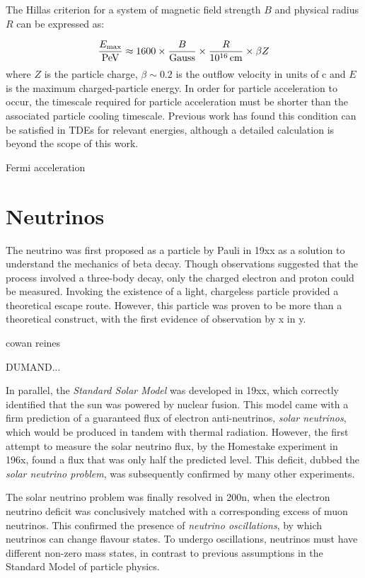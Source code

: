 The Hillas criterion  for a system of magnetic field strength $B$ and physical radius $R$ can be expressed as\cite{1984ARA&A..22..425H}:

\begin{equation}
\frac{E_{ \textup{max}}}{ \textup{PeV}} \approx
1600 \times \frac{B}{ \textup{Gauss}} \times \frac{R}{10^{16} \,  \textup{cm}} \times
\beta Z
\end{equation}
where $Z$ is the particle charge, $\beta \sim 0.2$ is the outflow velocity in units of c and $E$ is the maximum charged-particle energy. In order for particle acceleration to occur, the timescale required for particle acceleration must be shorter than the associated particle cooling timescale. Previous work has found this condition can be satisfied in TDEs for relevant energies\cite{2017ApJ...838....3S, 2017PhRvD..95l3001L}, although a detailed calculation is beyond the scope of this work.



Fermi acceleration

\section{Neutrinos}

The neutrino was first proposed as a particle by Pauli in 19xx as a solution to understand the mechanics of beta decay. Though observations suggested that the process involved a three-body decay, only the charged electron and proton could be measured. Invoking the existence of a light, chargeless particle provided a theoretical escape route. However, this particle was proven to be more than a theoretical construct, with the first evidence of observation by x in y.

cowan reines

DUMAND...

In parallel, the \emph{Standard Solar Model} was developed in 19xx, which correctly identified that the sun was powered by nuclear fusion. This model came with a firm prediction of a guaranteed flux of electron anti-neutrinos, \emph{solar neutrinos}, which would be produced in tandem with thermal radiation. However, the first attempt to measure the solar neutrino flux, by the Homestake experiment in 196x, found a flux that was only half the predicted level. This deficit, dubbed the \emph{solar neutrino problem}, was subsequently confirmed by many other experiments.

The solar neutrino problem was finally resolved in 200n, when the electron neutrino deficit was conclusively matched with a corresponding excess of muon neutrinos. This confirmed the presence of \emph{neutrino oscillations}, by which neutrinos can change flavour states. To undergo oscillations, neutrinos must have different non-zero mass states, in contrast to previous assumptions in the Standard Model of particle physics. 

